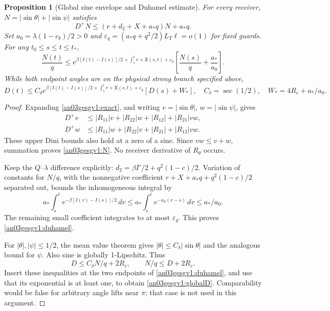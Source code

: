 \documentclass[11pt]{article}
\newtheorem{proposition}{Proposition}[section]
\theoremstyle{remark}\newtheorem{remark}[proposition]{Remark}
\newcommand{\dd}{\,d}
\begin{document}
\begin{proposition}[Global sine envelope and Duhamel estimate]
\label{an03gesgv1:sine}
For every receiver, $N=|\sin\theta|+|\sin\psi|$ satisfies
\begin{equation}
 D^+N\le (r+d_2+X+a_*q)N+a_*q.
 \label{an03gesgv1:N}
\end{equation}
Set $a_0=\lambda(1-c_b)/2>0$ and
$\varepsilon_q=(a_*q+q^2/2)L_T\ell=o(1)$ for fixed guards.
For any $t_0\le s\le t\le t_*$,
\begin{equation}
 \frac{N(t)}q\le
 e^{\beta[I(t)-I(s)]/2+\int_s^tr+\mathfrak X(s,t)+\varepsilon_q}
 \left[\frac{N(s)}q+\frac{a_*}{a_0}\right].
 \label{an03gesgv1:duhamel}
\end{equation}
While both endpoint angles are on the physical strong branch
specified above,
\begin{equation}
 D(t)\le C_\delta
 e^{\beta[I(t)-I(s)]/2+\int_s^tr+\mathfrak X(s,t)+\varepsilon_q}
 [D(s)+W_*],\quad
 C_\delta=\sec(1/2),\quad W_*=4R_c+a_*/a_0.
 \label{an03gesgv1:globalD}
\end{equation}
\end{proposition}
\begin{proof}
Expanding \eqref{an03gesgv1:exact}, and writing
$v=|\sin\theta|$, $w=|\sin\psi|$, gives
\begin{align*}
 D^+v&\le |R_{11}|v+|R_{22}|w+|R_{12}|+|R_{21}|vw,\\
 D^+w&\le |R_{11}|w+|R_{22}|v+|R_{21}|+|R_{12}|vw.
\end{align*}
These upper Dini bounds also hold at a zero of a sine.
Since $vw\le v+w$, summation proves \eqref{an03gesgv1:N}.
No receiver derivative of $R_\theta$ occurs.

Keep the $Q$--$\lambda$ difference explicitly:
$d_2=\beta I'/2+q^2(1-c)/2$.
Variation of constants for $N/q$, with the nonnegative
coefficient $r+X+a_*q+q^2(1-c)/2$ separated out, bounds
the inhomogeneous integral by
\[
 a_*\int_s^t e^{-\beta[I(v)-I(s)]/2}\dd v
 \le a_*\int_s^t e^{-a_0(v-s)}\dd v\le a_*/a_0.
\]
The remaining small coefficient integrates to at most
$\varepsilon_q$. This proves \eqref{an03gesgv1:duhamel}.

For $|\theta|,|\psi|\le1/2$, the mean value theorem gives
$|\theta|\le C_\delta|\sin\theta|$ and the analogous
bound for $\psi$. Also sine is globally 1-Lipschitz. Thus
\[
 D\le C_\delta N/q+2R_c,\qquad N/q\le D+2R_c.
\]
Insert these inequalities at the two endpoints of
\eqref{an03gesgv1:duhamel}, and use that its exponential
is at least one, to obtain \eqref{an03gesgv1:globalD}.
Comparability would be false for arbitrary angle lifts near
$\pi$; that case is not used in this argument.
\end{proof}
\end{document}
